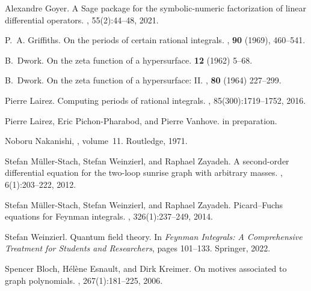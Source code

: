 \documentclass[a4paper,12pt]{article}
\numberwithin{equation}{section}
\numberwithin{figure}{subsection}
\theoremstyle{plain}
\theoremstyle{plain}
\theoremstyle{definition}
\theoremstyle{plain}
\theoremstyle{remark}
\theoremstyle{plain}
\begin{document}
\begin{thebibliography}{99}
Alexandre Goyer.
\newblock A {S}age package for the symbolic-numeric factorization of linear
  differential operators.
, 55(2):44--48,
2021.


P.~A. Griffiths.
\newblock On the periods of certain rational integrals.
, {\bf 90} (1969), 460--541.

B.~Dwork.
\newblock On the zeta function of a hypersurface.
 {\bf 12} (1962) 5--68.

B.~Dwork.
\newblock On the zeta function of a hypersurface: {{II}}.
, {\bf 80} (1964) 227--299.

Pierre Lairez.
\newblock Computing periods of rational integrals.
, 85(300):1719--1752, 2016.
\newblock [arXiv:1404.5069]

Pierre Lairez, Eric Pichon-Pharabod, and Pierre Vanhove.
\newblock in preparation.



Noboru Nakanishi,
, volume~11.
\newblock Routledge, 1971.


Stefan M{\"u}ller-Stach, Stefan Weinzierl, and Raphael Zayadeh.
\newblock A second-order differential equation for the two-loop sunrise graph
  with arbitrary masses.
, 6(1):203--222,
2012.
\newblock [arXiv:1112.4360]

Stefan M{\"u}ller-Stach, Stefan Weinzierl, and Raphael Zayadeh.
\newblock Picard--{F}uchs equations for {F}eynman integrals.
,
326(1):237--249, 2014.
\newblock [arXiv:1212.4389]

Stefan Weinzierl.
\newblock Quantum field theory.
\newblock In {\em Feynman Integrals: A Comprehensive Treatment for Students and
  Researchers}, pages 101--133. Springer, 2022.
\newblock [arXiv:2201.03593] 


Spencer Bloch, H{\'e}l{\`e}ne Esnault, and Dirk Kreimer.
\newblock On motives associated to graph polynomials.
,
267(1):181--225, 2006.


\end{thebibliography}
\end{document}
